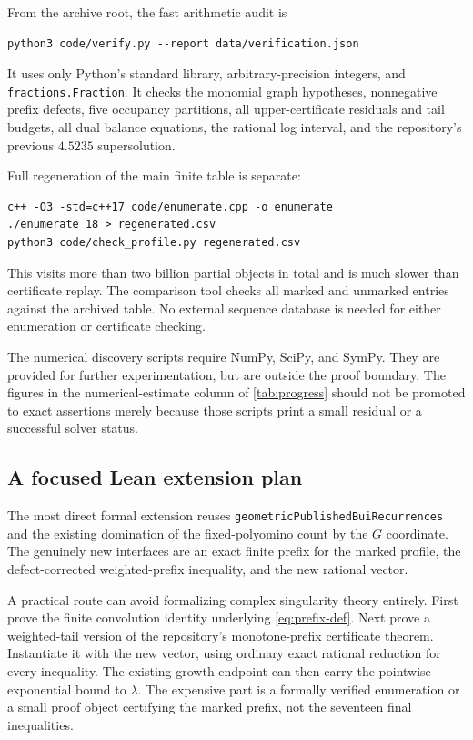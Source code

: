 \documentclass[11pt,a4paper]{article}
\theoremstyle{definition}
\theoremstyle{remark}
\begin{document}
From the archive root, the fast arithmetic audit is
\begin{lstlisting}
python3 code/verify.py --report data/verification.json
\end{lstlisting}
It uses only Python's standard library, arbitrary-precision integers, and
\texttt{fractions.Fraction}. It checks the monomial graph hypotheses,
nonnegative prefix defects, five occupancy partitions, all upper-certificate
residuals and tail budgets, all dual balance equations, the rational log
interval, and the repository's previous $4.5235$ supersolution.

Full regeneration of the main finite table is separate:
\begin{lstlisting}
c++ -O3 -std=c++17 code/enumerate.cpp -o enumerate
./enumerate 18 > regenerated.csv
python3 code/check_profile.py regenerated.csv
\end{lstlisting}
This visits more than two billion partial objects in total and is much slower
than certificate replay. The comparison tool checks all marked and unmarked
entries against the archived table. No external sequence database is needed
for either enumeration or certificate checking.

The numerical discovery scripts require NumPy, SciPy, and SymPy. They are
provided for further experimentation, but are outside the proof boundary.
The figures in the numerical-estimate column of \cref{tab:progress} should
not be promoted to exact assertions merely because those scripts print a
small residual or a successful solver status.

\subsection{A focused Lean extension plan}
The most direct formal extension reuses
\texttt{geometricPublishedBuiRecurrences} and the existing domination of the
fixed-polyomino count by the $G$ coordinate. The genuinely new interfaces are
an exact finite prefix for the marked profile, the defect-corrected
weighted-prefix inequality, and the new rational vector.

A practical route can avoid formalizing complex singularity theory entirely.
First prove the finite convolution identity underlying
\eqref{eq:prefix-def}. Next prove a weighted-tail version of the repository's
monotone-prefix certificate theorem. Instantiate it with the new vector,
using ordinary exact rational reduction for every inequality. The existing
growth endpoint can then carry the pointwise exponential bound to $\lambda$.
The expensive part is a formally verified enumeration or a small proof object
certifying the marked prefix, not the seventeen final inequalities.
\end{document}
